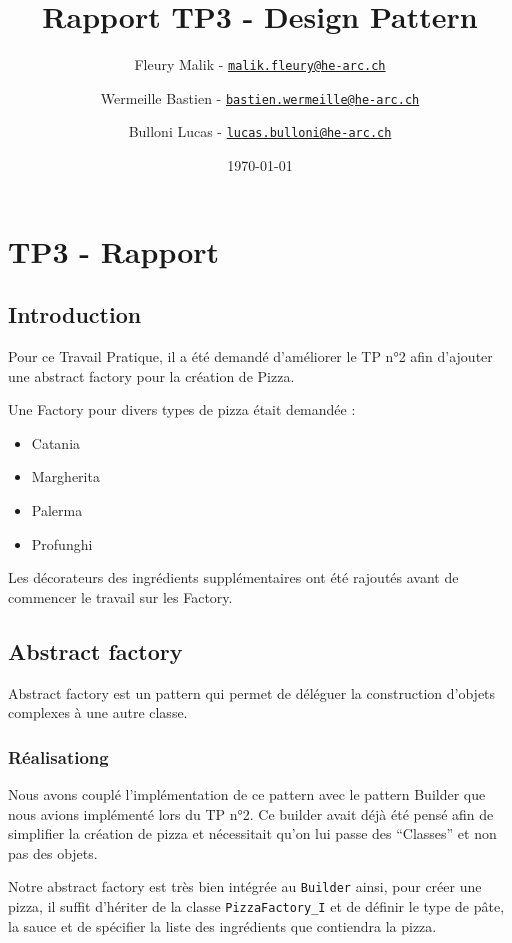 \documentclass[french,]{article}
\title{Rapport TP3 - Design Pattern}
\author{Fleury Malik -
\href{mailto:malik.fleury@he-arc.ch}{\nolinkurl{malik.fleury@he-arc.ch}} \and Wermeille Bastien -
\href{mailto:bastien.wermeille@he-arc.ch}{\nolinkurl{bastien.wermeille@he-arc.ch}} \and Bulloni Lucas -
\href{mailto:lucas.bulloni@he-arc.ch}{\nolinkurl{lucas.bulloni@he-arc.ch}}}
\date{\today}
\providecommand{\tightlist}{%
  \setlength{\itemsep}{0pt}\setlength{\parskip}{0pt}}
\begin{document}
\maketitle

{
\setcounter{tocdepth}{5}
\tableofcontents
}
\section{TP3 - Rapport}\label{tp3---rapport}

\subsection{Introduction}\label{introduction}

Pour ce Travail Pratique, il a été demandé d'améliorer le TP n°2 afin
d'ajouter une abstract factory pour la création de Pizza.

Une Factory pour divers types de pizza était demandée :

\begin{itemize}
\tightlist
\item
  Catania
\item
  Margherita
\item
  Palerma
\item
  Profunghi
\end{itemize}

Les décorateurs des ingrédients supplémentaires ont été rajoutés avant
de commencer le travail sur les Factory.

\subsection{Abstract factory}\label{abstract-factory}

Abstract factory est un pattern qui permet de déléguer la construction
d'objets complexes à une autre classe.

\subsubsection{Réalisationg}\label{ruxe9alisationg}

Nous avons couplé l'implémentation de ce pattern avec le pattern Builder
que nous avions implémenté lors du TP n°2. Ce builder avait déjà été
pensé afin de simplifier la création de pizza et nécessitait qu'on lui
passe des ``Classes'' et non pas des objets.

Notre abstract factory est très bien intégrée au \texttt{Builder} ainsi,
pour créer une pizza, il suffit d'hériter de la classe
\texttt{PizzaFactory\_I} et de définir le type de pâte, la sauce et de
spécifier la liste des ingrédients que contiendra la pizza.
\end{document}
